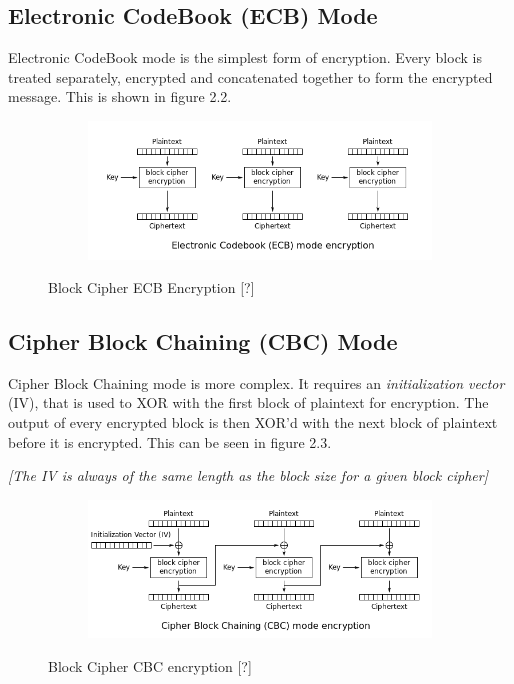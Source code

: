 \documentclass[bsc,frontabs,twoside,singlespacing,parskip,deptreport]{infthesis}     %
\begin{document}
\subsection{Electronic CodeBook (ECB) Mode}
Electronic CodeBook mode is the simplest form of encryption. Every block is treated separately, encrypted and concatenated together to form the encrypted message. This is shown in figure 2.2.

\begin{figure}[H]
\centering
\begin{subfigure}{1.0\textwidth}
  \includegraphics[width=1\linewidth]
  {images/crypto/ecb.png}
\end{subfigure}
\caption{Block Cipher ECB Encryption [?]}
\end{figure}
\subsection{Cipher Block Chaining (CBC) Mode}

Cipher Block Chaining mode is more complex. It requires an \textit{initialization vector} (IV), that is used to XOR with the first block of plaintext for encryption. The output of every encrypted block is then XOR'd with the next block of plaintext before it is encrypted. This can be seen in figure 2.3.

\textit{[The IV is always of the same length as the block size for a given block cipher]}

\begin{figure}[H]
\centering
\begin{subfigure}{1.0\textwidth}
  \includegraphics[width=1\linewidth]
  {images/crypto/cbc.png}
\end{subfigure}
\caption{Block Cipher CBC encryption [?]}
\end{figure}
\end{document}

